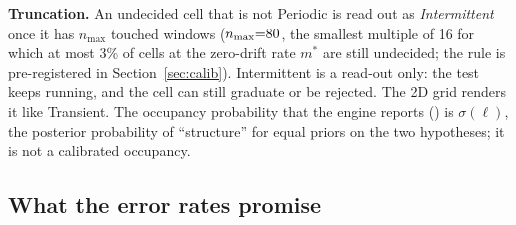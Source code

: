 \noindent\textbf{Truncation.} An undecided cell that is not Periodic is read out as \emph{Intermittent} once it has $n_{\max}$ touched windows ($n_{\max}{=}80$, the smallest multiple of 16 for which at most 3\% of cells at the zero-drift rate $m^\ast$ are still undecided; the rule is pre-registered in Section~\ref{sec:calib}). Intermittent is a read-out only: the test keeps running, and the cell can still graduate or be rejected. The 2D grid renders it like Transient. The occupancy probability that the engine reports () is $\sigma(\ell)$, the posterior probability of ``structure'' for equal priors on the two hypotheses; it is not a calibrated occupancy.

\begin{algorithm}[t]
\caption{ for , as in }\label{alg:endwindowsprt}
\end{algorithm}

\subsection{What the error rates promise}\label{subsec:promise}

